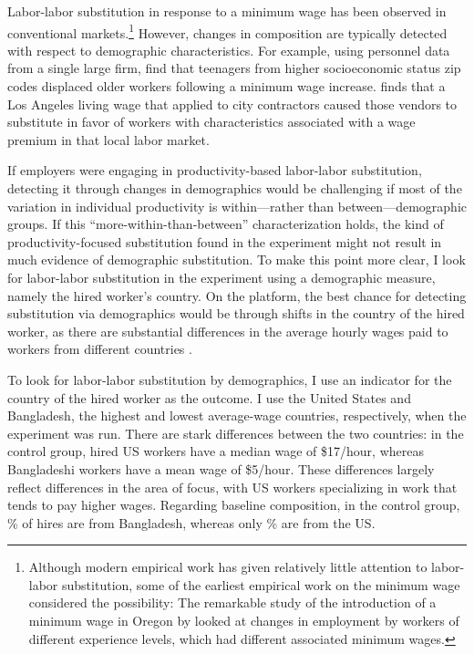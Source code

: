 \documentclass[AER]{AEA}
\begin{document}
Labor-labor substitution in response to a minimum wage has been observed in conventional markets.\footnote{
  Although modern empirical work has given relatively little attention to labor-labor substitution, some of the earliest empirical work on the minimum wage considered the possibility:
  The remarkable study of the introduction of a minimum wage in Oregon by \cite{obenauer1915} looked at changes in employment by workers of different experience levels, which had different associated minimum wages. 
} 
However, changes in composition are typically detected with respect to demographic characteristics.
For example, using personnel data from a single large firm, \cite{giuliano2009minimum} find that teenagers from higher socioeconomic status zip codes displaced older workers following a minimum wage increase.  
\cite{fairris2008} finds that a Los Angeles living wage that applied to city contractors caused those vendors to substitute in favor of workers with characteristics associated with a wage premium in that local labor market.

If employers were engaging in productivity-based labor-labor substitution, detecting it through changes in demographics would be challenging if most of the variation in individual productivity is within---rather than between---demographic groups.  
If this ``more-within-than-between'' characterization holds, the kind of productivity-focused substitution found in the experiment might not result in much evidence of demographic substitution. 
To make this point more clear, I look for labor-labor substitution in the experiment using a demographic measure, namely the hired worker's country. 
On the platform, the best chance for detecting substitution via demographics would be through shifts in the country of the hired worker, as there are substantial differences in the average hourly wages paid to workers from different countries \citep{agrawal2015digitization}.


To look for labor-labor substitution by demographics, I use an indicator for the country of the hired worker as the outcome.
I use the United States and Bangladesh, the highest and lowest average-wage countries, respectively, when the experiment was run.
There are stark differences between the two countries: in the control group, hired US workers have a median wage of \$17/hour, whereas Bangladeshi workers have a mean wage of \$5/hour.
These differences largely reflect differences in the area of focus, with US workers specializing in work that tends to pay higher wages.
Regarding baseline composition, in the control group, \BANGfractionControl{}\% of hires are from Bangladesh, whereas only \USfractionControl{}\% are from the US.
\end{document}
